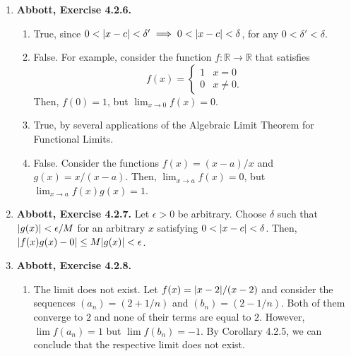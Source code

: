 \documentclass{article}
\DeclarePairedDelimiter\abs{\lvert}{\rvert}
\newcommand{\R}{\mathbb{R}}
\newcommand{\exc}[2][Abbott]{\item \textbf{#1, Exercise #2.}}
\newcommand{\lep}[1][L]{#1et $\epsilon > 0$ be arbitrary}
\begin{document}
\begin{enumerate}
\begin{enumerate}
        \item \lep. Choose $\delta = \min(1, \epsilon/6)$. Now, choose an arbitrary $x$ such that $0 < \abs{x-2} < \delta$. It follows that $\abs{x+3} < 6$. Then, $\abs{(x^2+x-1)-5} = \abs{x+3}\abs{x-2} < 6\abs{x-2} < \epsilon$.
        
        \item \lep. Choose $\delta = \min(1, 6\epsilon)$. Now, choose an arbitrary $x$ such that $0 < \abs{x-3} < \delta$. It follows that $\abs{3x} > 6$. Then,
        \begin{equation*}
            \abs*{\frac{1}{x}-\frac{1}{3}} = \abs*{\frac{x-3}{3x}} < \frac{\abs{x-3}}{6} < \epsilon.
        \end{equation*}
    \end{enumerate}
    
    \exc{4.2.6}
    \begin{enumerate}
        \item True, since $0 < \abs{x-c} < \delta' \implies 0 < \abs{x-c} < \delta$, for any $0 < \delta' < \delta$.
        
        \item False. For example, consider the function $f : \R \to \R$ that satisfies
        \begin{equation*}
            f(x) = \begin{cases}
            1 & x = 0 \\
            0 & x \neq 0.
            \end{cases}
        \end{equation*}Then, $f(0) = 1$, but $\lim_{x \to 0} f(x) = 0$.
        
        \item True, by several applications of the Algebraic Limit Theorem for Functional Limits.
        
        \item False. Consider the functions $f(x) = (x-a)/x$ and $g(x) = x/(x-a)$. Then, $\lim_{x \to a} f(x) = 0$, but $\lim_{x \to a} f(x)g(x) = 1$.
    \end{enumerate}
    
    \exc{4.2.7}
    \lep. Choose $\delta$ such that $\abs{g(x)} < \epsilon/M$ for an arbitrary $x$ satisfying $0 < \abs{x-c} < \delta$. Then, $\abs{f(x)g(x) - 0} \leq M\abs{g(x)} < \epsilon$.
    
    \exc{4.2.8}
    \begin{enumerate}
        \item The limit does not exist. Let $f(x) = \abs{x-2}/(x-2)$ and consider the sequences $(a_n) = (2+1/n)$ and $(b_n) = (2-1/n)$. Both of them converge to $2$ and none of their terms are equal to $2$. However, $\lim f(a_n) = 1$ but $\lim f(b_n) = -1$. By Corollary 4.2.5, we can conclude that the respective limit does not exist.
        

\end{enumerate}
\end{enumerate}
\end{document}
